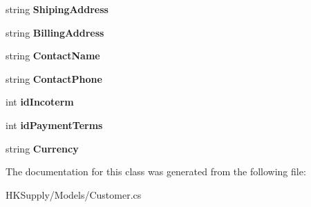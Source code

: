 \begin{DoxyCompactItemize}
\item 
\mbox{\label{class_h_k_supply_1_1_models_1_1_customer_aa96f375cec2cf3a749f72525b1ce4f36}} 
string {\bfseries Shiping\+Address}
\item 
\mbox{\label{class_h_k_supply_1_1_models_1_1_customer_a0ef5a3d143c02f5f01034f63616ec88b}} 
string {\bfseries Billing\+Address}
\item 
\mbox{\label{class_h_k_supply_1_1_models_1_1_customer_a52ec06dbf5626f8fd7b46bd0189fc0f5}} 
string {\bfseries Contact\+Name}
\item 
\mbox{\label{class_h_k_supply_1_1_models_1_1_customer_a575063986e551c006263f89b4ab6b522}} 
string {\bfseries Contact\+Phone}
\item 
\mbox{\label{class_h_k_supply_1_1_models_1_1_customer_aafc92abc1367162a2cfd9aafeeff3bcd}} 
int {\bfseries id\+Incoterm}
\item 
\mbox{\label{class_h_k_supply_1_1_models_1_1_customer_a63268d32fbf9d3e7ed3ad42b52e0ed3d}} 
int {\bfseries id\+Payment\+Terms}
\item 
\mbox{\label{class_h_k_supply_1_1_models_1_1_customer_a60662a4e763416385919b83cfc18cadd}} 
string {\bfseries Currency}
\end{DoxyCompactItemize}


The documentation for this class was generated from the following file\+:\begin{DoxyCompactItemize}
\item 
H\+K\+Supply/\+Models/Customer.\+cs\end{DoxyCompactItemize}
